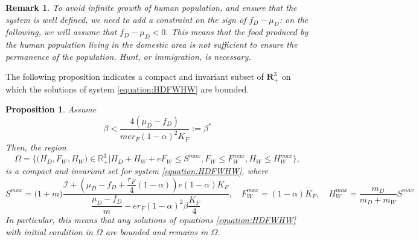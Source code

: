 \documentclass{article}
\newcommand{\cI}{\mathcal{I}}
\newtheorem{prop}{Proposition}
\newtheorem{remark}{Remark}
\begin{document}
\begin{remark}
To avoid infinite growth of human population, and ensure that the system is well defined, we need to add a constraint on the sign of $f_D - \mu_D$: on the following, we will assume that $f_D - \mu_D < 0$. This means that the food produced by the human population living in the domestic area is not sufficient to ensure the permanence of the population. Hunt, or immigration, is necessary. 
\end{remark}

The following proposition indicates a compact and invariant subset of $\mathbf{R}_+^3$ on which the solutions of system \eqref{equation:HDFWHW} are bounded.

\begin{prop}\label{prop:invariantRegion} 
Assume 
\begin{equation*}
\beta < \dfrac{4(\mu_D - f_D)}{m e r_F (1-\alpha)^2 K_F} := \beta^*
\end{equation*}
Then, the region
$$\Omega = \Big\{\Big(H_D, F_W, H_W \Big) \in \mathbb{R}_+^3  \Big|H_D + H_W + eF_W \leq S^{max}, F_W \leq F_W^{max}, H_W \leq H_W^{max} \Big\},$$
is a compact and invariant set for system \eqref{equation:HDFWHW}, 
where
$$
S^{max} = \Big(1 + m \Big) \dfrac{\cI + \left(\mu_D - f_D + \dfrac{r_F}{4}(1-\alpha) \right) e (1-\alpha)K_F }{\dfrac{\mu_D - f_D}{m} - er_F (1-\alpha)^2 \beta \dfrac{K_F}{4}},
\quad
F_W^{max} = (1-\alpha)K_F,
\quad
H_W^{max} = \dfrac{m_D}{m_D + m_W} S^{max}
$$
In particular, this means that any solutions of equations \eqref{equation:HDFWHW} with initial condition in $\Omega$ are bounded and remains in $\Omega$.
\end{prop}
%
\end{document}
